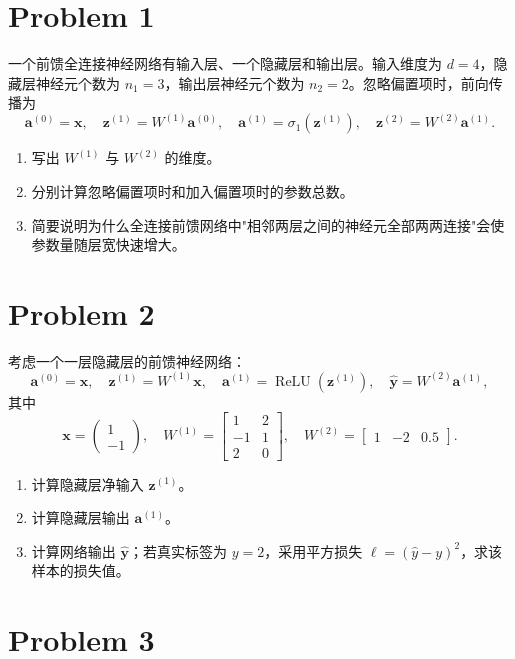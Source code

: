 \section*{Problem 1}

一个前馈全连接神经网络有输入层、一个隐藏层和输出层。输入维度为 $d = 4$，隐藏层神经元个数为 $n_1 = 3$，输出层神经元个数为 $n_2 = 2$。忽略偏置项时，前向传播为
\[
\bm{a}^{(0)} = \bm{x},\quad
\bm{z}^{(1)} = W^{(1)} \bm{a}^{(0)},\quad
\bm{a}^{(1)} = \sigma_1(\bm{z}^{(1)}),\quad
\bm{z}^{(2)} = W^{(2)} \bm{a}^{(1)}.
\]
\begin{enumerate}
    \item 写出 $W^{(1)}$ 与 $W^{(2)}$ 的维度。
    \item 分别计算忽略偏置项时和加入偏置项时的参数总数。
    \item 简要说明为什么全连接前馈网络中"相邻两层之间的神经元全部两两连接"会使参数量随层宽快速增大。
\end{enumerate}

\section*{Problem 2}

考虑一个一层隐藏层的前馈神经网络：
\[
\bm{a}^{(0)} = \bm{x},\quad
\bm{z}^{(1)} = W^{(1)} \bm{x},\quad
\bm{a}^{(1)} = \operatorname{ReLU}(\bm{z}^{(1)}),\quad
\hat{\bm{y}} = W^{(2)} \bm{a}^{(1)},
\]
其中
\[
\bm{x} = \begin{pmatrix} 1 \\ -1 \end{pmatrix},\quad
W^{(1)} = \begin{bmatrix}
    1 & 2 \\
    -1 & 1 \\
    2 & 0
\end{bmatrix},\quad
W^{(2)} = \begin{bmatrix} 1 & -2 & 0.5 \end{bmatrix}.
\]
\begin{enumerate}
    \item 计算隐藏层净输入 $\bm{z}^{(1)}$。
    \item 计算隐藏层输出 $\bm{a}^{(1)}$。
    \item 计算网络输出 $\hat{\bm{y}}$；若真实标签为 $y = 2$，采用平方损失 $\ell = (\hat{y} - y)^2$，求该样本的损失值。
\end{enumerate}

\section*{Problem 3}

